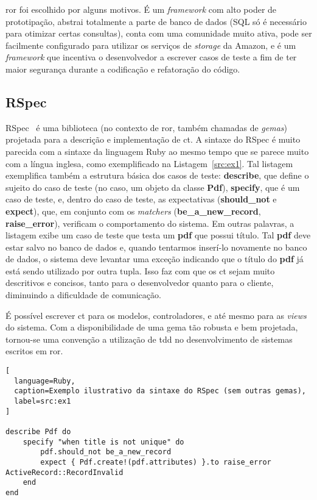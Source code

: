 \gls{ror} foi escolhido por alguns motivos. É um \textit{framework} com alto poder de prototipação, abstrai totalmente
a parte de banco de dados (SQL só é necessário para otimizar certas consultas), conta com uma comunidade muito ativa,
pode ser facilmente configurado para utilizar os serviços de \textit{storage} da Amazon, e é um \textit{framework} que
incentiva o desenvolvedor a escrever casos de teste a fim de ter maior segurança durante a codificação e refatoração do código.

\subsection{RSpec}

RSpec~\cite{RSpec} é uma biblioteca (no contexto de \gls{ror}, também chamadas de \textit{gemas}) projetada para a descrição e implementação de
\gls{ct}. A sintaxe do RSpec é muito parecida com a sintaxe da linguagem Ruby ao mesmo tempo que se parece muito com a língua inglesa,
como exemplificado na Listagem~\ref{src:ex1}. Tal listagem exemplifica também a estrutura básica dos casos de teste: \textbf{describe}, que
define o sujeito do caso de teste (no caso, um objeto da classe \textbf{Pdf}), \textbf{specify}, que é um caso de teste, e, dentro do caso de teste,
as expectativas (\textbf{should\_not} e \textbf{expect}), que, em conjunto com os \textit{matchers} (\textbf{be\_a\_new\_record}, \textbf{raise\_error}),
verificam o comportamento do sistema. Em outras palavras, a listagem exibe um caso de teste que testa um \textbf{pdf} que possui título. Tal
\textbf{pdf} deve estar salvo no banco de dados e, quando tentarmos inserí-lo novamente no banco de dados, o sistema deve levantar uma exceção
indicando que o título do \textbf{pdf} já está sendo utilizado por outra tupla.
Isso faz com que os \gls{ct} sejam muito descritivos e concisos, tanto para o desenvolvedor quanto para o cliente, diminuindo a dificuldade
de comunicação.

É possível escrever \gls{ct} para os modelos, controladores, e até mesmo para as \textit{views} do sistema. Com a disponibilidade de uma gema
tão robusta e bem projetada, tornou-se uma convenção a utilização de \gls{tdd} no desenvolvimento de sistemas escritos em \gls{ror}.

\begin{lstlisting}[
  language=Ruby,
  caption=Exemplo ilustrativo da sintaxe do RSpec (sem outras gemas),
  label=src:ex1
]

describe Pdf do
	specify "when title is not unique" do
		pdf.should_not be_a_new_record
		expect { Pdf.create!(pdf.attributes) }.to raise_error ActiveRecord::RecordInvalid
	end
end

\end{lstlisting}

